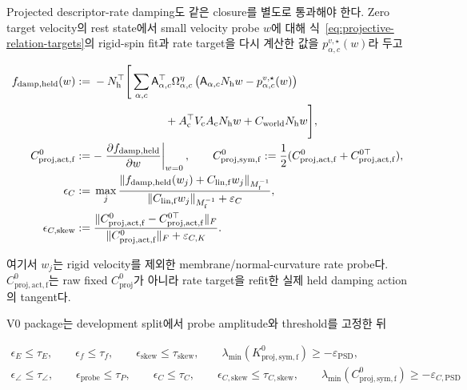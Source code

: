 \documentclass[11pt,a4paper]{article}
\newcommand{\eps}{\varepsilon}
\begin{document}
Projected descriptor-rate damping도 같은 closure를 별도로 통과해야 한다.
Zero target velocity의 rest state에서 small velocity probe \(w\)에 대해
식~\eqref{eq:projective-relation-targets}의 rigid-spin fit과 rate target을 다시 계산한 값을
\(p_{\alpha,c}^{v,\star}(w)\)라 두고

\begin{equation}
\begin{aligned}
  f_{\mathrm{damp,held}}(w)
  &:={}-N_{\mathrm h}^\top\Bigg[
  \sum_{\alpha,c}\mathsf A_{\alpha,c}^\top\Omega_{\alpha,c}^{\eta}
  \left(\mathsf A_{\alpha,c}N_{\mathrm h}w-p_{\alpha,c}^{v,\star}(w)\right)\\
  &\hspace{8.0em}
  +A_{\mathrm c}^\top V_{\mathrm c}A_{\mathrm c}N_{\mathrm h}w
  +C_{\mathrm{world}}N_{\mathrm h}w\Bigg],\\
  C_{\mathrm{proj,act,f}}^0
  &:=-\left.\frac{\partial f_{\mathrm{damp,held}}}{\partial w}\right|_{w=0},
  \qquad
  C_{\mathrm{proj,sym,f}}^0
  :=\frac12(C_{\mathrm{proj,act,f}}^0+C_{\mathrm{proj,act,f}}^{0\top}),\\
  \epsilon_C
  &:={}\max_j
  \frac{\|f_{\mathrm{damp,held}}(w_j)+C_{\mathrm{lin,f}}w_j\|_{M_{\mathrm f}^{-1}}}
       {\|C_{\mathrm{lin,f}}w_j\|_{M_{\mathrm f}^{-1}}+\eps_C},\\
  \epsilon_{C,\mathrm{skew}}
  &:={}\frac{\|C_{\mathrm{proj,act,f}}^0-C_{\mathrm{proj,act,f}}^{0\top}\|_F}
       {\|C_{\mathrm{proj,act,f}}^0\|_F+\eps_{C,K}}.
  \label{eq:rest-linear-projective-damping-closure}
\end{aligned}
\end{equation}

여기서 \(w_j\)는 rigid velocity를 제외한 membrane/normal-curvature rate probe다.
\(C_{\mathrm{proj,act,f}}^0\)는 raw fixed \(C_{\mathrm{proj}}^0\)가 아니라
rate target을 refit한 실제 held damping action의 tangent다.

V0 package는 development split에서 probe amplitude와 threshold를 고정한 뒤

\begin{equation}
\begin{gathered}
  \epsilon_E\le\tau_E,\qquad
  \epsilon_f\le\tau_f,\qquad
  \epsilon_{\mathrm{skew}}\le\tau_{\mathrm{skew}},\qquad
  \lambda_{\min}(K_{\mathrm{proj,sym,f}}^0)\ge-\eps_{\mathrm{PSD}},\\
  \epsilon_\angle\le\tau_\angle,\qquad
  \epsilon_{\mathrm{probe}}\le\tau_P,\qquad
  \epsilon_C\le\tau_C,\qquad
  \epsilon_{C,\mathrm{skew}}\le\tau_{C,\mathrm{skew}},\qquad
  \lambda_{\min}(C_{\mathrm{proj,sym,f}}^0)\ge-\eps_{C,\mathrm{PSD}}
\end{gathered}
  \label{eq:klin-projective-hard-gate}
\end{equation}
\end{document}
